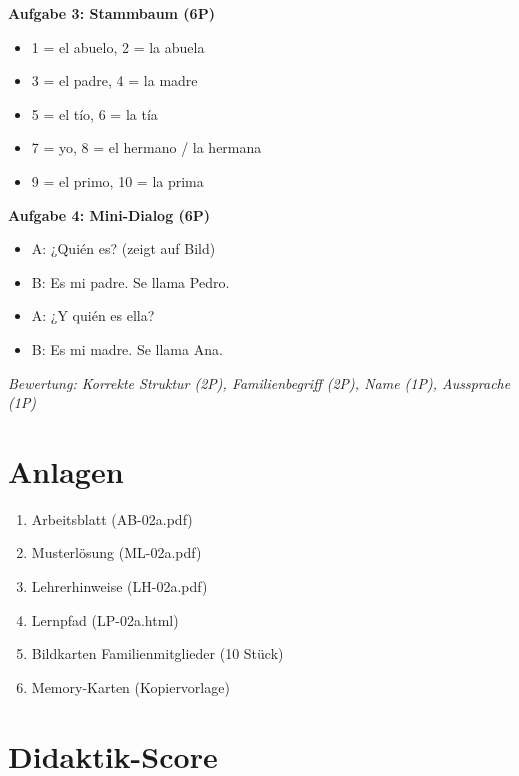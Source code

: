 \documentclass[11pt,a4paper]{article}
\begin{document}
\textbf{Aufgabe 3: Stammbaum (6P)}
\begin{itemize}
    \item 1 = el abuelo, 2 = la abuela
    \item 3 = el padre, 4 = la madre
    \item 5 = el tío, 6 = la tía
    \item 7 = yo, 8 = el hermano / la hermana
    \item 9 = el primo, 10 = la prima
\end{itemize}

\textbf{Aufgabe 4: Mini-Dialog (6P)}
\begin{itemize}
    \item A: ¿Quién es? (zeigt auf Bild)
    \item B: Es mi padre. Se llama Pedro.
    \item A: ¿Y quién es ella?
    \item B: Es mi madre. Se llama Ana.
\end{itemize}

\textit{Bewertung: Korrekte Struktur (2P), Familienbegriff (2P), Name (1P), Aussprache (1P)}

\section{Anlagen}

\begin{enumerate}
    \item Arbeitsblatt (AB-02a.pdf)
    \item Musterlösung (ML-02a.pdf)
    \item Lehrerhinweise (LH-02a.pdf)
    \item Lernpfad (LP-02a.html)
    \item Bildkarten Familienmitglieder (10 Stück)
    \item Memory-Karten (Kopiervorlage)
\end{enumerate}

\newpage
\section{Didaktik-Score}
\end{document}
